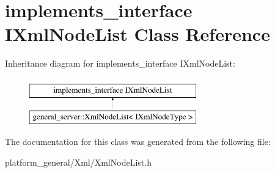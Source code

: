 \hypertarget{classimplements__interface_01IXmlNodeList}{\section{implements\-\_\-interface \-I\-Xml\-Node\-List \-Class \-Reference}
\label{classimplements__interface_01IXmlNodeList}
}
\-Inheritance diagram for implements\-\_\-interface \-I\-Xml\-Node\-List\-:\begin{figure}[H]
\begin{center}
\leavevmode
\includegraphics[height=2.000000cm]{classimplements__interface_01IXmlNodeList}
\end{center}
\end{figure}


\-The documentation for this class was generated from the following file\-:\begin{DoxyCompactItemize}
\item 
platform\-\_\-general/\-Xml/\-Xml\-Node\-List.\-h\end{DoxyCompactItemize}
